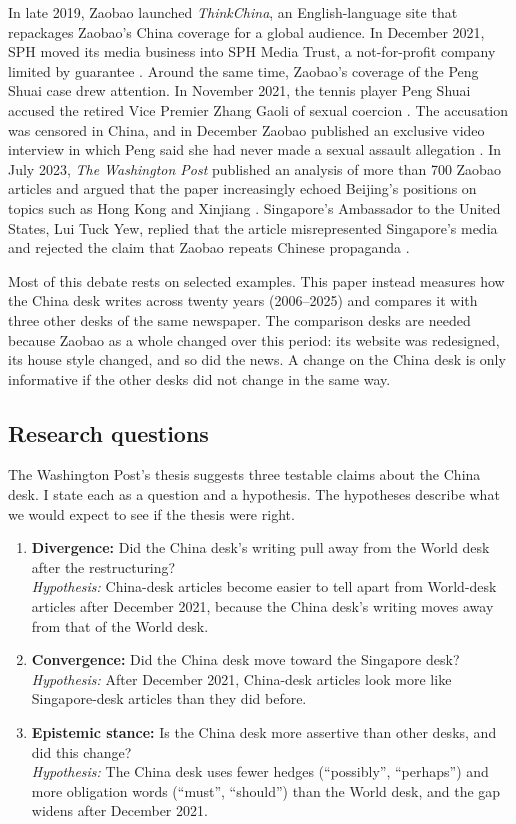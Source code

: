 \documentclass[11pt]{article}
\begin{document}
In late 2019, Zaobao launched \textit{ThinkChina}, an English-language site that repackages Zaobao's China coverage for a global audience. In December 2021, SPH moved its media business into SPH Media Trust, a not-for-profit company limited by guarantee \cite{ho2022}. Around the same time, Zaobao's coverage of the Peng Shuai case drew attention. In November 2021, the tennis player Peng Shuai accused the retired Vice Premier Zhang Gaoli of sexual coercion \cite{gan2021}. The accusation was censored in China, and in December Zaobao published an exclusive video interview in which Peng said she had never made a sexual assault allegation \cite{gu2021}. In July 2023, \textit{The Washington Post} published an analysis of more than 700 Zaobao articles and argued that the paper increasingly echoed Beijing's positions on topics such as Hong Kong and Xinjiang \cite{mahtani2023}. Singapore's Ambassador to the United States, Lui Tuck Yew, replied that the article misrepresented Singapore's media and rejected the claim that Zaobao repeats Chinese propaganda \cite{lui2023}.

Most of this debate rests on selected examples. This paper instead measures how the China desk writes across twenty years (2006--2025) and compares it with three other desks of the same newspaper. The comparison desks are needed because Zaobao as a whole changed over this period: its website was redesigned, its house style changed, and so did the news. A change on the China desk is only informative if the other desks did not change in the same way.

\subsection*{Research questions}

The Washington Post's thesis suggests three testable claims about the China desk. I state each as a question and a hypothesis. The hypotheses describe what we would expect to see if the thesis were right.

\begin{enumerate}[label=\textbf{Q\arabic*.}, leftmargin=*]
\item \textbf{Divergence:} Did the China desk's writing pull away from the World desk after the restructuring? \\
\textit{Hypothesis:} China-desk articles become easier to tell apart from World-desk articles after December 2021, because the China desk's writing moves away from that of the World desk.
\item \textbf{Convergence:} Did the China desk move toward the Singapore desk? \\
\textit{Hypothesis:} After December 2021, China-desk articles look more like Singapore-desk articles than they did before.
\item \textbf{Epistemic stance:} Is the China desk more assertive than other desks, and did this change? \\
\textit{Hypothesis:} The China desk uses fewer hedges (``possibly'', ``perhaps'') and more obligation words (``must'', ``should'') than the World desk, and the gap widens after December 2021.
\end{enumerate}
\end{document}
